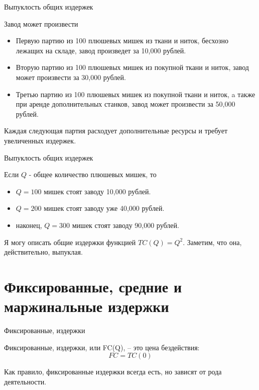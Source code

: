 \documentclass{beamer}
\begin{document}
\begin{frame}{Выпуклость общих издержек}

Завод может произвести 

\begin{itemize}
  \item Первую партию из 100 плюшевых мишек из ткани и ниток, бесхозно лежащих на складе, завод произведет за 10,000 рублей.
  \item Вторую партию из 100 плюшевых мишек из покупной ткани и ниток, завод может произвести за 30,000 рублей.
  \item Третью партию из 100 плюшевых мишек из покупной ткани и ниток, a также при аренде дополнительных станков, завод может произвести за 50,000 рублей.
\end{itemize}

Каждая следующая партия расходует дополнительные ресурсы и требует увеличенных издержек.

\end{frame}

\begin{frame}{Выпуклость общих издержек}

Если $Q$ - общее количество плюшевых мишек, то

\begin{itemize}
  \item $Q=100$ мишек стоят заводу 10,000 рублей.
  \item $Q=200$ мишек стоят заводу уже 40,000 рублей.
  \item наконец, $Q=300$ мишек стоят заводу 90,000 рублей.
\end{itemize}

Я могу описать общие издержки функцией $TC(Q)=Q^2$. Заметим, что она, действительно, выпуклая.

\end{frame}

\section{Фиксированные, средние и маржинальные издержки}

\begin{frame}{Фиксированные, издержки}

\begin{definition}
\alert{Фиксированные, издержки}, или FC(Q), – это цена бездействия:
$$FC = TC(0)$$
\end{definition}

Как правило, фиксированные издержки всегда есть, но зависят от рода деятельности.

\end{frame}
\end{document}

